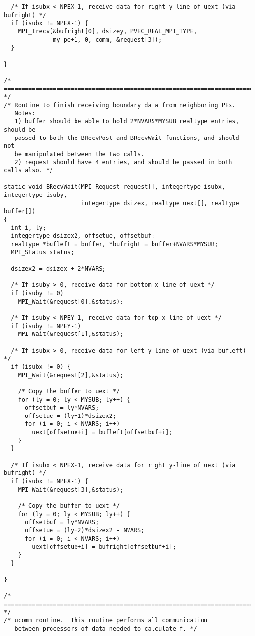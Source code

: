 \begin{verbatim}
  /* If isubx < NPEX-1, receive data for right y-line of uext (via bufright) */
  if (isubx != NPEX-1) {
    MPI_Irecv(&bufright[0], dsizey, PVEC_REAL_MPI_TYPE,
              my_pe+1, 0, comm, &request[3]);
  }
  
}

/* ======================================================================= */
/* Routine to finish receiving boundary data from neighboring PEs.
   Notes:
   1) buffer should be able to hold 2*NVARS*MYSUB realtype entries, should be
   passed to both the BRecvPost and BRecvWait functions, and should not
   be manipulated between the two calls.
   2) request should have 4 entries, and should be passed in both calls also. */

static void BRecvWait(MPI_Request request[], integertype isubx, integertype isuby,
                      integertype dsizex, realtype uext[], realtype buffer[])
{
  int i, ly;
  integertype dsizex2, offsetue, offsetbuf;
  realtype *bufleft = buffer, *bufright = buffer+NVARS*MYSUB;
  MPI_Status status;
  
  dsizex2 = dsizex + 2*NVARS;
  
  /* If isuby > 0, receive data for bottom x-line of uext */
  if (isuby != 0)
    MPI_Wait(&request[0],&status);
  
  /* If isuby < NPEY-1, receive data for top x-line of uext */
  if (isuby != NPEY-1)
    MPI_Wait(&request[1],&status);

  /* If isubx > 0, receive data for left y-line of uext (via bufleft) */
  if (isubx != 0) {
    MPI_Wait(&request[2],&status);

    /* Copy the buffer to uext */
    for (ly = 0; ly < MYSUB; ly++) {
      offsetbuf = ly*NVARS;
      offsetue = (ly+1)*dsizex2;
      for (i = 0; i < NVARS; i++)
        uext[offsetue+i] = bufleft[offsetbuf+i];
    }
  }

  /* If isubx < NPEX-1, receive data for right y-line of uext (via bufright) */
  if (isubx != NPEX-1) {
    MPI_Wait(&request[3],&status);

    /* Copy the buffer to uext */
    for (ly = 0; ly < MYSUB; ly++) {
      offsetbuf = ly*NVARS;
      offsetue = (ly+2)*dsizex2 - NVARS;
      for (i = 0; i < NVARS; i++)
        uext[offsetue+i] = bufright[offsetbuf+i];
    }
  }

}

/* ======================================================================= */
/* ucomm routine.  This routine performs all communication 
   between processors of data needed to calculate f. */


\end{verbatim}
